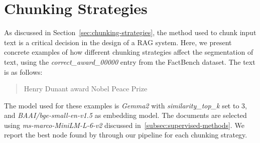 \chapter{Chunking Strategies}\label{ch:chunking}
As discussed in Section~\ref{sec:chunking-strategies}, the method used to chunk input text is a critical decision in the design of a \ac{RAG} system.
Here, we present concrete examples of how different chunking strategies affect the segmentation of text, using the \textit{correct\_award\_00000} entry from the FactBench dataset.
The text is as follows:
\begin{quote}
    Henry Dunant award Nobel Peace Prize
\end{quote}
The model used for these examples is \textit{Gemma2} with \textit{similarity\_top\_k} set to 3, and \textit{BAAI/bge-small-en-v1.5} as embedding model.
The documents are selected using \textit{ms-marco-MiniLM-L-6-v2} discussed in~\ref{subsec:supervised-methods}.
We report the best node found by through our pipeline for each chunking strategy.


